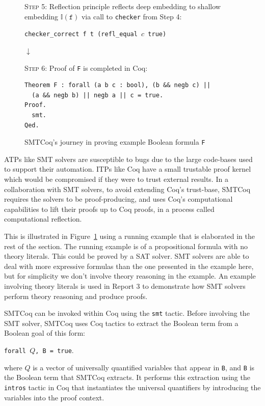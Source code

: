 \documentclass[11pt]{article}
\begin{document}
\begin{figure}
\begin{framed}
			\textsc{Step 5}: Reflection principle 
			reflects deep embedding to shallow 
			embedding $\mathbb{I}(\texttt{f})$
			via call to \texttt{checker} from 
			Step 4:
			\begin{center}
				\texttt{checker\_correct f t 
					(refl\_equal $c$ true)}
			\end{center}
		\end{framed}
		\vspace{-0.3in}
		\begin{center}
			$\downarrow$
		\end{center}
		\vspace{-0.3in}
		\begin{framed}
			\textsc{Step 6}: Proof of \texttt{F} is 
			completed in Coq:
			\begin{verbatim}
Theorem F : forall (a b c : bool), (b && negb c) || 
  (a && negb b) || negb a || c = true.
Proof.
  smt.
Qed.
			\end{verbatim}
		\end{framed}
		\caption{SMTCoq's journey in proving 
			example Boolean formula \texttt{F}}
		\label{fig:smtcoqex}
	\end{figure}
	
	ATPs like SMT solvers are susceptible 
	to bugs due to the large code-bases 
	used to support	their automation. 
	ITPs like Coq have a small trustable 
	proof kernel which would be 
	compromised if they were to trust
	external results. In a collaboration
	with SMT solvers, to avoid extending 
	Coq's trust-base, SMTCoq requires the 
	solvers to be proof-producing, and uses 
	Coq's computational capabilities 
	to lift their proofs up to Coq proofs, 
	in a process called computational 
	reflection. 
	
	This is illustrated in 
	Figure~\ref{fig:smtcoqex} using a 
	running example that is elaborated 
	in the rest of the section. The running
	example is of a propositional formula
	with no theory literals. This could be 
	proved by a SAT solver. SMT solvers 
	are able to deal with more expressive 
	formulas than the one presented in the 
	example here, but for simplicity
	we don't involve theory reasoning
	in the example. An example involving 
	theory literals is used in Report 3 
	to demonstrate how SMT solvers 
	perform theory reasoning and produce
	proofs.
	
	SMTCoq can be invoked within Coq 
	using the \texttt{smt} tactic.
	Before involving the SMT solver, 
	SMTCoq uses Coq tactics to extract
	the Boolean term from a
	Boolean goal of this form:
	\begin{center}
		\texttt{forall $Q$, \texttt{B} = true}.
	\end{center}
	where $Q$ is a vector of universally 
	quantified variables that appear in 
	\texttt{B}, and \texttt{B} is the Boolean
	term that SMTCoq extracts. It performs 
	this extraction using the \texttt{intros}
	tactic in Coq that instantiates the 
	universal quantifiers by introducing 
	the variables into the proof context.
	
\end{document}
